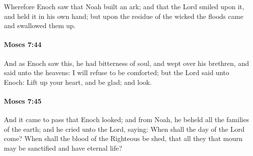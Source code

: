 			Wherefore Enoch saw that Noah built an ark; and that the Lord smiled upon it, and held it in his own hand; but upon the residue of the wicked the floods came and swallowed them up.


		\paragraph{Moses 7:44} %
			\label{MOSES-7-44}

			And as Enoch saw this, he had bitterness of soul, and wept over his brethren, and said unto the heavens: I will refuse to be comforted; but the Lord said unto Enoch: Lift up your heart, and be glad; and look.


		\paragraph{Moses 7:45} %
			\label{MOSES-7-45}

			And it came to pass that Enoch looked; and from Noah, he beheld all the families of the earth; and he cried unto the Lord, saying: When shall the day of the Lord come? When shall the blood of the Righteous be shed, that all they that mourn may be sanctified and have eternal life?


